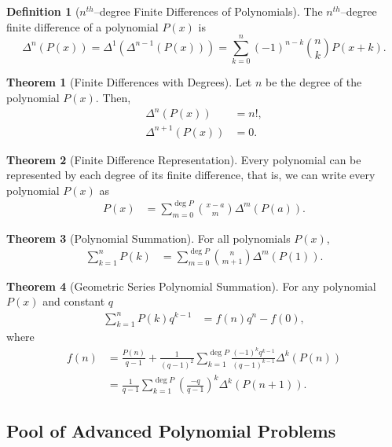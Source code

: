 \documentclass[12pt,a4paper]{memoir}
\theoremstyle{definition}
\newtheorem*{definition}{Definition}
\newtheorem{theorem}{Theorem}
\begin{document}
\begin{definition}[$n^{th}$--degree Finite Differences of Polynomials]
	The $n^{th}$--degree finite difference of a polynomial $P(x)$ is \[\Delta^n(P(x)) = \Delta^1\left(\Delta^{n-1}(P(x))\right) = \sum_{k=0}^n (-1)^{n-k} \binom{n}{k} P(x+k).\]
\end{definition}

\begin{theorem}[Finite Differences with Degrees]
	Let $n$ be the degree of the polynomial $P(x)$. Then,
	\begin{align*}
		\Delta^{n}(P(x)) &= n!,\\
		\Delta^{n+1}(P(x)) &= 0.
	\end{align*}
\end{theorem}

\begin{theorem}[Finite Difference Representation]
	Every polynomial can be represented by each degree of its finite difference, that is,
	we can write every polynomial $P(x)$ as
	\begin{align*}
		P(x) &= \sum_{m=0}^{\deg P} \binom{x-a}{m} \Delta^m(P(a)).
	\end{align*}
\end{theorem}


\begin{theorem}[Polynomial Summation]
	For all polynomials $P(x)$,
	\begin{align*}
		\sum_{k=1}^{n} P(k) &= \sum_{m=0}^{\deg P} \binom{n}{m+1} \Delta^m(P(1)).
	\end{align*}
\end{theorem}



\begin{theorem}[Geometric Series Polynomial Summation]
	For any polynomial $P(x)$ and constant $q$
	\begin{align*}
		\sum_{k=1}^{n} P(k) q^{k-1} &= f(n)q^n - f(0),
	\end{align*}
	where 
	\begin{align*}
		f(n) &= \frac{P(n)}{q-1} + \frac{1}{(q-1)^2} \sum_{k=1}^{\deg P} \frac{(-1)^kq^{k-1}}{(q-1)^{k-1}} \Delta^k(P(n))\\
		&=  \frac{1}{q-1} \sum_{k=1}^{\deg P} \left(\frac{-q}{q-1}\right)^{k} \Delta^k(P(n+1)). 
	\end{align*}
\end{theorem}

\newpage
\subsection{Pool of Advanced Polynomial Problems}
\end{document}
